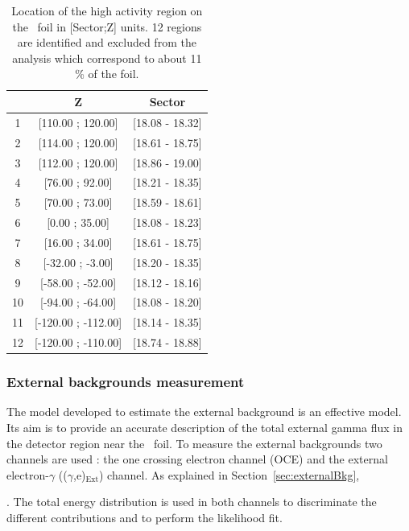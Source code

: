 \documentclass[main.tex]{subfiles}
\begin{document}
\begin{table}
\centering
\begin{tabular}{c|c|c}
  & Z                 & Sector \\
\midrule
1  & [110.00 ; 120.00]   & [18.08 - 18.32] \\ [0.1cm]
2  & [114.00 ; 120.00]   & [18.61 - 18.75] \\ [0.1cm]
3  & [112.00 ; 120.00]   & [18.86 - 19.00] \\ [0.1cm]
4  & [76.00 ; 92.00]     & [18.21 - 18.35] \\ [0.1cm]
5  & [70.00 ; 73.00]     & [18.59 - 18.61] \\ [0.1cm]
6  & [0.00 ; 35.00]      & [18.08 - 18.23] \\ [0.1cm]
7  & [16.00 ; 34.00]     & [18.61 - 18.75] \\ [0.1cm]
8  & [-32.00 ; -3.00]    & [18.20 - 18.35] \\ [0.1cm]
9  & [-58.00 ; -52.00]   & [18.12 - 18.16] \\ [0.1cm]
10 & [-94.00 ; -64.00]   & [18.08 - 18.20] \\ [0.1cm]
11 & [-120.00 ; -112.00] & [18.14 - 18.35] \\ [0.1cm]
12 & [-120.00 ; -110.00] & [18.74 - 18.88] \\
\bottomrule
\end{tabular}
\caption{Location of the high activity region on the \Cd~foil in [Sector;Z] units. 12 regions are identified and excluded from the analysis which correspond to about 11 \% of the foil.}
\label{Tab:HighActivityRegion}
\end{table}


\FloatBarrier


\subsubsection{External backgrounds measurement}


\NI The model developed to estimate the external background is an effective model. Its aim is to provide an accurate description of the total external gamma flux in the detector region near the \Cd~foil. To measure the external backgrounds two channels are used : the one crossing electron channel (OCE) and the external electron-$\gamma$ (($\gamma$,e)$_{\text{Ext}}$) channel. As explained in Section~\ref{sec:externalBkg}, 


\bigskip


.  The total energy distribution is used in both channels to discriminate the different contributions and to perform the likelihood fit.
\end{document}
